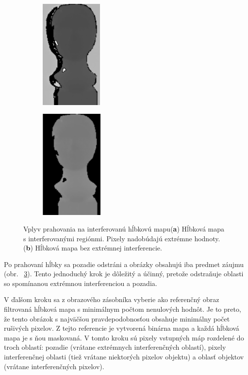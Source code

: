 \begin{figure}[h]
	\centering
	\begin{subfigure}[b]{0.49\textwidth}
		\centering
		\includegraphics[height=5.5cm]{figures/threshold_a.png}
		\caption{}
		\label{fig:threshold:a}
	\end{subfigure}
	\hskip 0pt
	\begin{subfigure}[b]{0.49\textwidth}
		\centering
		\includegraphics[height=5.5cm]{figures/threshold_b.png}
		\caption{}
		\label{fig:threshold:b}
	\end{subfigure}
	\caption{Vplyv prahovania na interferovanú hĺbkovú mapu(\textbf{a}) Hĺbková mapa s interferovanými regiónmi. Pixely nadobúdajú extrémne hodnoty. (\textbf{b}) Hĺbková mapa bez extrémnej interferencie.}
	\label{fig:threshold}
\end{figure}

Po prahovaní hĺbky sa pozadie odstráni a obrázky obsahujú iba predmet záujmu (obr. \, \ref{fig:threshold}). Tento jednoduchý krok je dôležitý a účinný, pretože odstraňuje oblasti so spomínanou extrémnou interferenciou a pozadia.

V ďalšom kroku sa z obrazového zásobníka vyberie ako referenčný obraz filtrovaná hĺbková mapa s minimálnym počtom nenulových hodnôt. Je to preto, že tento obrázok s najväčšou pravdepodobnosťou obsahuje minimálny počet rušivých pixelov. Z tejto referencie je vytvorená binárna mapa a každá hĺbková mapa je s ňou maskovaná. V tomto kroku sú pixely vstupných máp rozdelené do troch oblastí: pozadie (vrátane extrémnych interferenčných oblastí), pixely interferenčnej oblasti (tiež vrátane niektorých pixelov objektu) a oblasť objektov (vrátane interferenčných pixelov).


